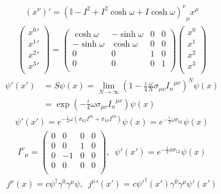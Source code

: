 \documentclass[floatfix,nofootinbib,superscriptaddress,fleqn]{revtex4}
\begin{document}
\begin{align*}
  {\left(x^\nu\right)'=\left(\mathbb{I}-I^2+I^2\cosh \omega+I\cosh \omega \right)^\nu}_\mu x^\mu
\end{align*}
\begin{align*}
  \begin{pmatrix}
    {x^0}' \\
    {x^1}' \\
    {x^2}'\\
    {x^3}'\\
  \end{pmatrix}
  =
  \begin{pmatrix}
    \cosh \omega&-\sinh \omega&0&0  \\
    -\sinh \omega&\cosh \omega&0&0  \\
    0&0&1&0  \\
    0&0&0&1  \\
  \end{pmatrix}
  \begin{pmatrix}
    {x^0} \\
    {x^1} \\
    {x^2}\\
    {x^3}\\
  \end{pmatrix}
\end{align*}
\begin{align*}
  \psi'(x')&=S\psi(x)=\lim_{N\rightarrow \infty}\left(1-\frac{i}{4}\frac{\omega}{N}
  \sigma_{\mu\nu}{I_n}^{\mu\nu}\right)^N\psi(x) \\
  &=\exp{\left(-\frac{i}{4}\omega
  \sigma_{\mu\nu}{I_n}^{\mu\nu}\right)}\psi(x)
\end{align*}
\begin{align*}
  \psi'(x')=e^{-\frac{i}{4}\omega\left(
  \sigma_{01}{I}^{01}+\sigma_{10}{I}^{10}\right)}\psi(x)=e^{-\frac{i}{2}\omega\sigma_{01}}\psi(x)
\end{align*}
\begin{align*}
  {I^\nu}_\mu=\begin{pmatrix}
    0&0&0&0 \\
    0&0&1&0 \\
    0&-1&0&0 \\
    0&0&0&0 \\
  \end{pmatrix},  \,\,\,
  \psi'(x')=e^{-\frac{i}{2}\phi\sigma_{12}}\psi(x)
\end{align*}
\begin{align*}
  j^\mu(x)=c\psi^\dagger\gamma^0\gamma^\mu\psi,\,\,\,
  {j^\mu}'(x')=c\psi'^\dagger(x')\gamma^0\gamma^\mu\psi'(x')
\end{align*}
\end{document}
